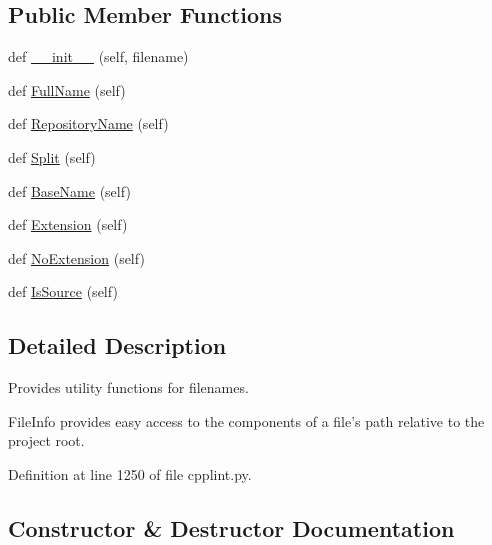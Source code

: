 \subsection*{Public Member Functions}
\begin{DoxyCompactItemize}
\item 
def \hyperlink{classcpplint_1_1_file_info_abd3ff77aab027af2476b3a1d97b1f89c}{\+\_\+\+\_\+init\+\_\+\+\_\+} (self, filename)
\item 
def \hyperlink{classcpplint_1_1_file_info_aed56577368c45cdf45fc4c9109129145}{Full\+Name} (self)
\item 
def \hyperlink{classcpplint_1_1_file_info_a2b3b79b7d46221a6b9d0ea0bebac2061}{Repository\+Name} (self)
\item 
def \hyperlink{classcpplint_1_1_file_info_a43f1c5ff1771da52e29c60c114955e72}{Split} (self)
\item 
def \hyperlink{classcpplint_1_1_file_info_a1a12ed63ddc2ffd8f6a105e3ab4d6289}{Base\+Name} (self)
\item 
def \hyperlink{classcpplint_1_1_file_info_a2554b504117839931e901b59a59c67ae}{Extension} (self)
\item 
def \hyperlink{classcpplint_1_1_file_info_acb46555a72b346966f4bf28c08e3b1fa}{No\+Extension} (self)
\item 
def \hyperlink{classcpplint_1_1_file_info_a157f8d3266d7291321db88cdad3b2879}{Is\+Source} (self)
\end{DoxyCompactItemize}


\subsection{Detailed Description}
\begin{DoxyVerb}Provides utility functions for filenames.

FileInfo provides easy access to the components of a file's path
relative to the project root.
\end{DoxyVerb}
 

Definition at line 1250 of file cpplint.\+py.



\subsection{Constructor \& Destructor Documentation}
